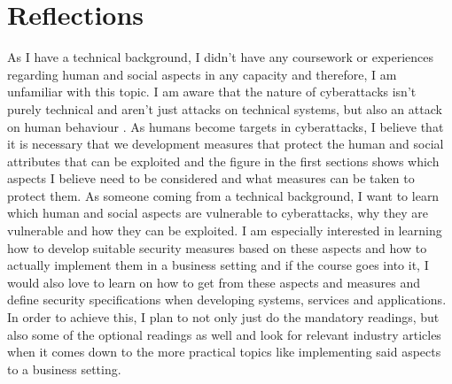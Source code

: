 \documentclass[12pt]{article}
\begin{document}
\section{Reflections}

As I have a technical background, I didn't have any coursework or experiences regarding human and social aspects in any capacity and therefore, I am unfamiliar with this topic.
I am aware that the nature of cyberattacks isn't purely technical and aren't just attacks on technical systems, but also an attack on human behaviour \cite{indrajit2017social}. 
\newline
As humans become targets in cyberattacks, I believe that it is necessary that we development measures that protect the human and social attributes that can be exploited and the figure in the first sections shows which aspects I believe need to be considered and what measures can be taken to protect them.
\newline
As someone coming from a technical background, I want to learn which human and social aspects are vulnerable to cyberattacks, why they are vulnerable and how they can be exploited. I am especially interested in learning how to develop suitable security measures based on these aspects and how to actually implement them in a business setting and if the course goes into it, I would also love to learn on how to get from these aspects and measures and define security specifications when developing systems, services and applications.
\newline
In order to achieve this, I plan to not only just do the mandatory readings, but also some of the optional readings as well and look for relevant industry articles when it comes down to the more practical topics like implementing said aspects to a business setting.



\end{document}
